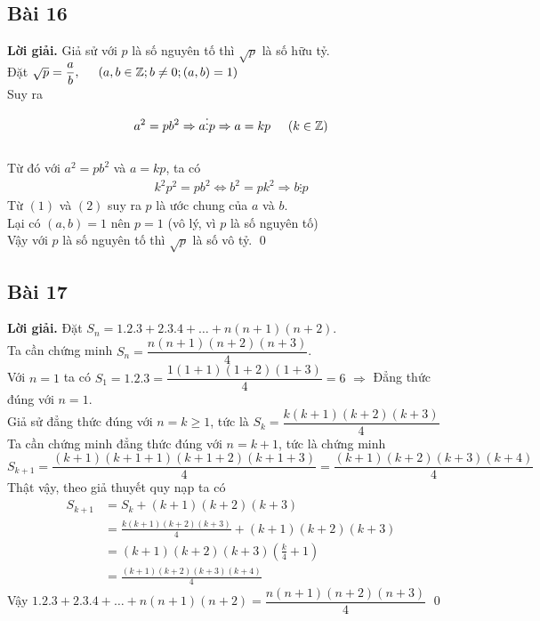 \documentclass[a4paper,14pt]{article}
\begin{document}
    \subsection{Bài 16}
        \textbf{Lời giải.}
            Giả sử với $p$ là số nguyên tố thì $\sqrt{p}$ là số hữu tỷ.\\
            Đặt $\sqrt{p}=\dfrac{a}{b}, \hspace{0.5cm}(a,b\in \mathbb{Z};b\neq 0;(a,b)=1)$\\
            Suy ra
                \begin{align}
                    a^2=pb^2 \Rightarrow a \vdots  p \Rightarrow a=kp \hspace{0.5cm} (k\in \mathbb{Z}) 
                \end{align}
            \\
            Từ đó với $a^2=pb^2$ và $a=kp$, ta có
                \begin{align}
                    k^2p^2=pb^2\Leftrightarrow b^2=pk^2 \Rightarrow b \vdots  p
                \end{align} 
            Từ $(1)$ và $(2)$ suy ra $p$ là ước chung của $a$ và $b$. \\
            Lại có $(a,b)=1$ nên $p=1$ (vô lý, vì $p$ là số nguyên tố) \\
            Vậy với $p$ là số nguyên tố thì $\sqrt{p}$ là số vô tỷ.
        \qed
    \subsection{Bài 17}
        \textbf{Lời giải.}
        Đặt $S_n=1.2.3+2.3.4+\ldots+n(n+1)(n+2)$. \\
        Ta cần chứng minh $S_n=\dfrac{n(n+1)(n+2)(n+3)}{4}$. \\
        Với $n=1$ ta có $S_1=1.2.3=\dfrac{1(1+1)(1+2)(1+3)}{4}=6$ $\Rightarrow$ Đẳng thức đúng với $n=1$. \\
        Giả sử đẳng thức đúng với $n=k\geqslant1$, tức là
        $S_k=\dfrac{k(k+1)(k+2)(k+3)}{4}$ \\
        Ta cần chứng minh đẳng thức đúng với $n=k+1$, tức là chứng minh
        $$S_{k+1}=\frac{(k+1)(k+1+1)(k+1+2)(k+1+3)}{4}=\frac{(k+1)(k+2)(k+3)(k+4)}{4}$$
        Thật vậy, theo giả thuyết quy nạp ta có
        \begin{align*}
            S_{k+1}&=S_k+(k+1)(k+2)(k+3)
            \\&=\frac{k(k+1)(k+2)(k+3)}{4}+(k+1)(k+2)(k+3)
            \\&=(k+1)(k+2)(k+3)\left(\frac{k}{4}+1\right)
            \\&=\frac{(k+1)(k+2)(k+3)(k+4)}{4}
        \end{align*}
        Vậy $1.2.3+2.3.4+\ldots+n(n+1)(n+2)=\dfrac{n(n+1)(n+2)(n+3)}{4}$
        \qed
\end{document}
